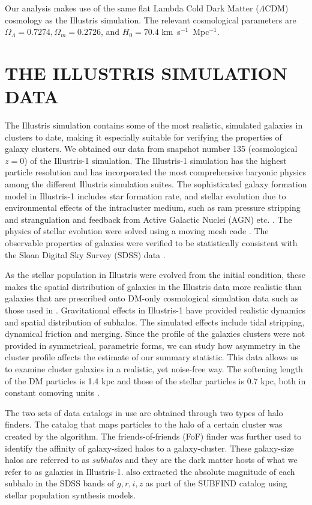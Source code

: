	Our analysis makes use of the same flat Lambda Cold Dark Matter ($\Lambda$CDM) cosmology
as the Illustris simulation. The relevant cosmological parameters are
$\Omega_\Lambda = 0.7274, \Omega_m = 0.2726$, and $H_0 = 70.4$
km~s$^{-1}$~Mpc$^{-1}$.

\section{THE ILLUSTRIS SIMULATION DATA} 
\label{sec:illustris_sim}
The Illustris simulation contains some of the most
realistic, simulated galaxies in clusters to date, making it especially suitable for 
verifying the properties of galaxy clusters. We obtained our data from 
snapshot number 135 (cosmological $z=0$) of the Illustris-1 simulation. The Illustris-1
simulation has the highest particle resolution and has incorporated the most 
comprehensive baryonic physics among the different Illustris simulation suites. 
The sophisticated galaxy formation model in Illustris-1 
includes star formation rate, and stellar evolution due to
environmental effects of the intracluster medium, such as ram pressure stripping and
strangulation and feedback from Active Galactic Nuclei (AGN) etc. \citep{Genel2014a}.
The physics of stellar
evolution were solved using a moving mesh code {} \citep{Springel2010}.
The observable properties of galaxies were verified to be statistically consistent
with the Sloan Digital Sky Survey (SDSS) data
\citep{Vogelsberger2014}. 

As the stellar population in Illustris were evolved from the initial condition,
these makes the spatial distribution of galaxies in the Illustris data more 
realistic than galaxies that are prescribed onto DM-only cosmological
simulation data such as those used in \cite{Harvey2013d}.  
Gravitational effects in Illustris-1 have provided realistic dynamics and
spatial distribution of subhalos. The simulated effects include
tidal stripping, dynamical friction and merging. 
Since the profile of the galaxies clusters were not
provided in symmetrical, parametric forms, we can study 
how asymmetry in the cluster profile affects the estimate of our summary 
statistic. This data allows us to examine cluster galaxies
in a realistic, yet noise-free way. The softening length of the DM particles is
1.4 kpc and those of the stellar particles is 
0.7 kpc, both in constant comoving units \citep{Genel2014a}.

The two sets of data catalogs in use are obtained through two types of halo
finders. The catalog that maps particles to the halo of a certain cluster was 
created by the {} algorithm. The friends-of-friends (FoF) 
finder \citep{Davis1985} was further used to identify the affinity
of galaxy-sized halos to a galaxy-cluster. 
These galaxy-size halos are referred to as {\it subhalos} and 
they are the dark matter hosts of what we refer to as galaxies in Illustris-1. 
\cite{Vogelsberger2014a} also extracted the 
absolute magnitude of each subhalo in
the SDSS bands of $g, r, i, z$ as part of the {\sc
SUBFIND} catalog using stellar population synthesis models.

